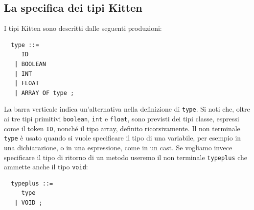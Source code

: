 \subsection{La specifica dei tipi Kitten}\label{subsec:types_specification}
%
I tipi Kitten sono descritti dalle seguenti produzioni:
%
\begin{verbatim}
  type ::=
     ID
   | BOOLEAN
   | INT
   | FLOAT
   | ARRAY OF type ;
\end{verbatim}
%
La barra verticale indica un'alternativa nella definizione di \texttt{type}.
Si noti che, oltre ai tre tipi primitivi \texttt{boolean}, \texttt{int}
e \texttt{float}, sono previsti dei tipi classe, espressi come il token
\texttt{ID}, nonch\'e il tipo array, definito ricorsivamente.
Il non terminale \texttt{type} \`e usato quando si vuole specificare
il tipo di una variabile, per esempio in una dichiarazione, o in una
espressione, come in un cast. Se vogliamo invece specificare il tipo
di ritorno di un metodo useremo il
non terminale \texttt{typeplus} che ammette anche il tipo \texttt{void}:
%
\begin{verbatim}
  typeplus ::=
     type
   | VOID ;
\end{verbatim}
%
